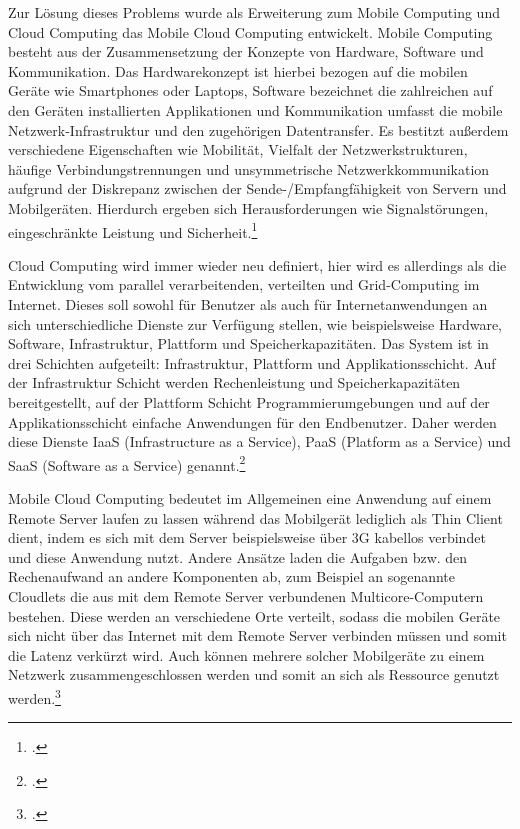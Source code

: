 Zur Lösung dieses Problems wurde als Erweiterung zum Mobile Computing und Cloud Computing das Mobile Cloud Computing entwickelt. Mobile Computing besteht aus der Zusammensetzung der Konzepte von Hardware, Software und Kommunikation. Das Hardwarekonzept ist hierbei bezogen auf die mobilen Geräte wie Smartphones oder Laptops, Software bezeichnet die zahlreichen auf den Geräten installierten Applikationen und Kommunikation umfasst die mobile Netzwerk-Infrastruktur und den zugehörigen Datentransfer. Es bestitzt außerdem verschiedene Eigenschaften wie Mobilität, Vielfalt der Netzwerkstrukturen, häufige Verbindungstrennungen und unsymmetrische Netzwerkkommunikation aufgrund der Diskrepanz zwischen der Sende-/Empfangfähigkeit von Servern und Mobilgeräten. Hierdurch ergeben sich Herausforderungen wie Signalstörungen, eingeschränkte Leistung und Sicherheit.\footcite[Vgl.][Seite 25]{MCC2}

Cloud Computing wird immer wieder neu definiert, hier wird es allerdings als die Entwicklung vom parallel verarbeitenden, verteilten und Grid-Computing im Internet. Dieses soll  sowohl für Benutzer als auch für Internetanwendungen an sich unterschiedliche Dienste zur Verfügung stellen, wie beispielsweise Hardware, Software, Infrastruktur, Plattform und Speicherkapazitäten. Das System ist in drei Schichten aufgeteilt: Infrastruktur, Plattform und Applikationsschicht. Auf der Infrastruktur Schicht werden Rechenleistung und Speicherkapazitäten bereitgestellt, auf der Plattform Schicht Programmierumgebungen und auf der Applikationsschicht einfache Anwendungen für den Endbenutzer. Daher werden diese Dienste IaaS (Infrastructure as a Service), PaaS (Platform as a Service) und SaaS (Software as a Service) genannt.\footcite[Vgl.][Seite 26]{MCC2}

Mobile Cloud Computing bedeutet im Allgemeinen eine Anwendung auf einem Remote Server laufen zu lassen während das Mobilgerät lediglich als Thin Client dient, indem es sich mit dem Server beispielsweise über 3G kabellos verbindet und diese Anwendung nutzt. Andere Ansätze laden die Aufgaben bzw. den Rechenaufwand an andere Komponenten ab, zum Beispiel an sogenannte Cloudlets die aus mit dem Remote Server verbundenen Multicore-Computern bestehen. Diese werden an verschiedene Orte verteilt, sodass die mobilen Geräte sich nicht über das Internet mit dem Remote Server verbinden müssen und somit die Latenz verkürzt wird. Auch können mehrere solcher Mobilgeräte zu einem Netzwerk zusammengeschlossen werden und somit an sich als Ressource genutzt werden.\footcite[Vgl.][Seite 87]{MCC}

